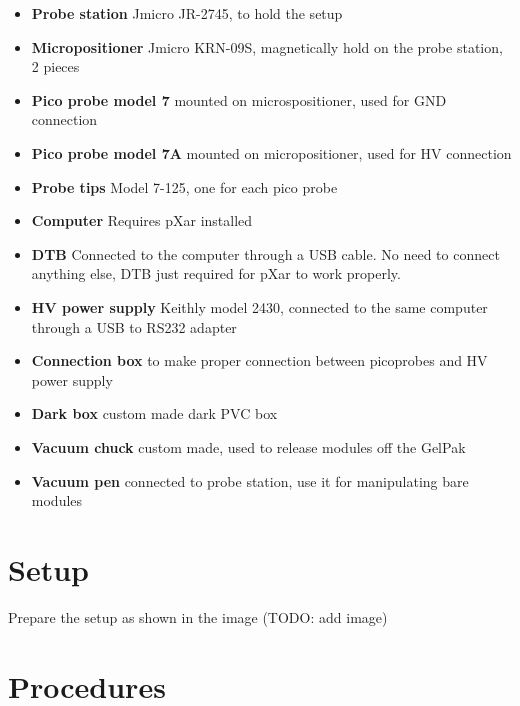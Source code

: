 \documentclass[10pt]{unlsilabsop}
\begin{document}
\begin{itemize}
\item \textbf{Probe station} Jmicro JR-2745, to hold the setup
\item \textbf{Micropositioner} Jmicro KRN-09S, magnetically hold on the probe station, 2 pieces
\item \textbf{Pico probe model 7} mounted on microspositioner, used for GND connection
\item \textbf{Pico probe model 7A} mounted on micropositioner, used for HV connection
\item \textbf{Probe tips} Model 7-125, one for each pico probe
\item \textbf{Computer} Requires pXar installed
\item \textbf{DTB} Connected to the computer through a USB cable. No need to connect anything else, DTB just required for pXar to work properly.
\item \textbf{HV power supply} Keithly model 2430, connected to the same computer through a USB to RS232 adapter
\item \textbf{Connection box} to make proper connection between picoprobes and HV power supply
\item \textbf{Dark box} custom made dark PVC box
\item \textbf{Vacuum chuck} custom made, used to release modules off the GelPak
\item \textbf{Vacuum pen} connected to probe station, use it for manipulating bare modules
\end{itemize}

\section{Setup}

Prepare the setup as shown in the image (TODO: add image)

\section{Procedures}
\end{document}
